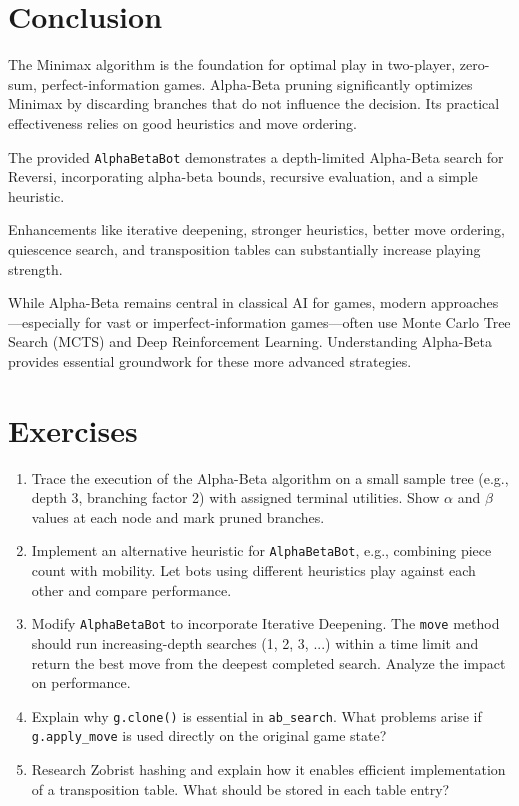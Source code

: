 \documentclass[11pt]{article}
\begin{document}
\section{Conclusion}

The Minimax algorithm is the foundation for optimal play in two-player, zero-sum, perfect-information games. Alpha-Beta pruning significantly optimizes Minimax by discarding branches that do not influence the decision. Its practical effectiveness relies on good heuristics and move ordering.

The provided \texttt{AlphaBetaBot} demonstrates a depth-limited Alpha-Beta search for Reversi, incorporating alpha-beta bounds, recursive evaluation, and a simple heuristic.

Enhancements like iterative deepening, stronger heuristics, better move ordering, quiescence search, and transposition tables can substantially increase playing strength.

While Alpha-Beta remains central in classical AI for games, modern approaches—especially for vast or imperfect-information games—often use Monte Carlo Tree Search (MCTS) and Deep Reinforcement Learning. Understanding Alpha-Beta provides essential groundwork for these more advanced strategies.

\section{Exercises}

\begin{enumerate}
    \item Trace the execution of the Alpha-Beta algorithm  on a small sample tree (e.g., depth 3, branching factor 2) with assigned terminal utilities. Show $\alpha$ and $\beta$ values at each node and mark pruned branches.

    \item Implement an alternative heuristic for \texttt{AlphaBetaBot}, e.g., combining piece count with mobility. Let bots using different heuristics play against each other and compare performance.

    \item Modify \texttt{AlphaBetaBot} to incorporate Iterative Deepening. The \texttt{move} method should run increasing-depth searches (1, 2, 3, ...) within a time limit and return the best move from the deepest completed search. Analyze the impact on performance.

    \item Explain why \texttt{g.clone()} is essential in \texttt{ab\_search}. What problems arise if \texttt{g.apply\_move} is used directly on the original game state?

    \item Research Zobrist hashing and explain how it enables efficient implementation of a transposition table. What should be stored in each table entry?
\end{enumerate}
\end{document}
